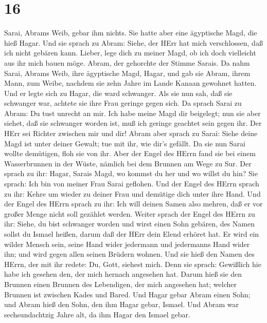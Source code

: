 \hypertarget{section-15}{%
\section{16}\label{section-15}}

 Sarai, Abrams Weib, gebar ihm nichts. Sie hatte aber eine
ägyptische Magd, die hieß Hagar.  Und sie sprach zu Abram:
Siehe, der HErr hat mich verschlossen, daß ich nicht gebären kann.
Lieber, lege dich zu meiner Magd, ob ich doch vielleicht aus ihr mich
bauen möge. Abram, der gehorchte der Stimme Sarais.  Da nahm
Sarai, Abrams Weib, ihre ägyptische Magd, Hagar, und gab sie Abram,
ihrem Mann, zum Weibe, nachdem sie zehn Jahre im Lande Kanaan gewohnet
hatten.  Und er legte sich zu Hagar, die ward schwanger. Als
sie nun sah, daß sie schwanger war, achtete sie ihre Frau geringe gegen
sich.  Da sprach Sarai zu Abram: Du tust unrecht an mir. Ich
habe meine Magd dir beigelegt; nun sie aber siehet, daß sie schwanger
worden ist, muß ich geringe geachtet sein gegen ihr. Der HErr sei
Richter zwischen mir und dir!  Abram aber sprach zu Sarai:
Siehe deine Magd ist unter deiner Gewalt; tue mit ihr, wie dir's
gefällt. Da sie nun Sarai wollte demütigen, floh sie von ihr.
 Aber der Engel des HErrn fand sie bei einem Wasserbrunnen
in der Wüste, nämlich bei dem Brunnen am Wege zu Sur.  Der
sprach zu ihr: Hagar, Sarais Magd, wo kommst du her und wo willst du
hin? Sie sprach: Ich bin von meiner Frau Sarai geflohen. 
Und der Engel des HErrn sprach zu ihr: Kehre um wieder zu deiner Frau
und demütige dich unter ihre Hand.  Und der Engel des HErrn
sprach zu ihr: Ich will deinen Samen also mehren, daß er vor großer
Menge nicht soll gezählet werden.  Weiter sprach der Engel
des HErrn zu ihr: Siehe, du bist schwanger worden und wirst einen Sohn
gebären, des Namen sollst du Ismael heißen, darum daß der HErr dein
Elend erhöret hat.  Er wird ein wilder Mensch sein, seine
Hand wider jedermann und jedermanns Hand wider ihn; und wird gegen allen
seinen Brüdern wohnen.  Und sie hieß den Namen des HErrn,
der mit ihr redete: Du, Gott, siehest mich. Denn sie sprach: Gewißlich
hie habe ich gesehen den, der mich hernach angesehen hat. 
Darum hieß sie den Brunnen einen Brunnen des Lebendigen, der mich
angesehen hat; welcher Brunnen ist zwischen Kades und Bared.
 Und Hagar gebar Abram einen Sohn; und Abram hieß den Sohn,
den ihm Hagar gebar, Ismael.  Und Abram war sechsundachtzig
Jahre alt, da ihm Hagar den Ismael gebar.

